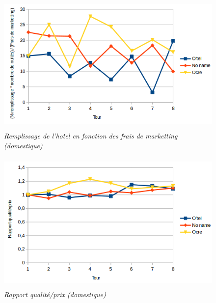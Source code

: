 \documentclass[a4paper,10pt]{article}
\begin{document}
    \begin{figure}[!ht]
      \begin{center}
	\includegraphics[height=7cm,keepaspectratio]{./images/marketting_part_marche.png}
      \end{center}
      \caption{\textit{Remplissage de l'hotel en fonction des frais de marketting (domestique)}}
      \label{marketting_part_marche}
    \end{figure}
    
    \begin{figure}[!ht]
      \begin{center}
	\includegraphics[height=7cm,keepaspectratio]{./images/rapport_qualite_prix.png}
      \end{center}
      \caption{\textit{Rapport qualité/prix (domestique)}}
    \end{figure}
\end{document}
